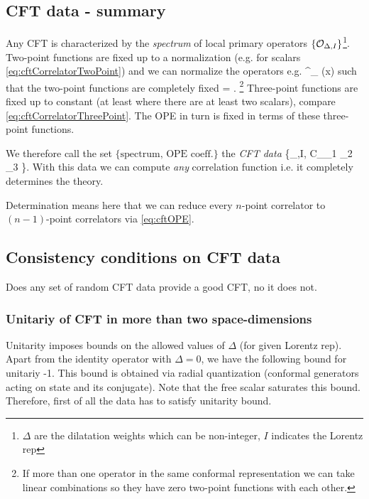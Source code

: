  	\subsection{CFT data - summary}
 	Any CFT is characterized by the \emph{spectrum} of local primary operators $\{\mathcal{O}_{\Delta,I} \}$\footnote{$\Delta$ are the dilatation weights which can be non-integer, $I$ indicates the Lorentz rep}. Two-point functions are fixed up to a normalization (e.g. for scalars \ref{eq:cftCorrelatorTwoPoint}) and we can normalize the operators e.g.
 	\bse 
 	\mO \rightarrow {} \equiv \mO^\prime_{\Delta} (x) 
 	\ese  
 	such that the two-point functions are completely fixed 
 	\bse 
 	 = . 
 	\ese 
 	\footnote{If more than one operator in the same conformal representation we can take linear combinations so they have zero two-point functions with each other.}
 	Three-point functions are fixed up to constant (at least where there are at least two scalars), compare \ref{eq:cftCorrelatorThreePoint}. The OPE in turn is fixed in terms of these three-point functions.
 	\begin{mybox}{}
 		We therefore call the set $\{\text{spectrum, OPE coeff.} \}$ the \emph{CFT data} 
 		\bse 
 		\{\mO_{\Delta,I}, C_{\mO_1 \mO_2 \mO_3} \}.
 		\ese 
 		With this data we can compute \emph{any} correlation function i.e. it completely determines the theory.
 	\end{mybox}
Determination means here that we can reduce every $n$-point correlator to $(n-1)$-point correlators via \ref{eq:cftOPE}.
\subsection{Consistency conditions on CFT data}
 Does any set of random CFT data provide a good CFT, no it does not.
 \subsubsection{Unitariy of CFT in more than two space-dimensions}
 	Unitarity imposes bounds on the allowed values of $\Delta$ (for given Lorentz rep). Apart from the identity operator with $\Delta =0$, we have the following bound for unitariy 
 	\be 
 	\Delta \geq {}-1.
 	\ee 
 	This bound is obtained via radial quantization (conformal generators acting on state and its conjugate). Note that the free scalar saturates this bound.
 	Therefore, first of all the data has to satisfy unitarity bound.
 	
